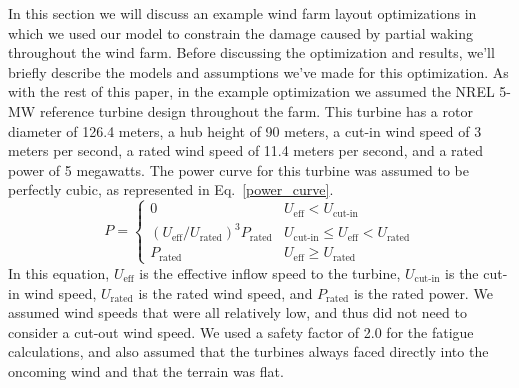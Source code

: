 \documentclass[11pt,letterpaper]{article}
\begin{document}
In this section we will discuss an example wind farm layout optimizations in which we used our model to constrain the damage caused by partial waking throughout the wind farm. Before discussing the optimization and results, we'll briefly describe the models and assumptions we've made for this optimization. As with the rest of this paper, in the example optimization we assumed the NREL 5-MW reference turbine design throughout the farm. This turbine has a rotor diameter of 126.4 meters, a hub height of 90 meters, a cut-in wind speed of 3 meters per second, a rated wind speed of 11.4 meters per second, and a rated power of 5 megawatts. The power curve for this turbine was assumed to be perfectly cubic, as represented in Eq.~\ref{power_curve}. 
% 
\begin{equation}
    P = \begin{cases} 
      0 &  U_\text{eff} < U_\text{cut-in} \\
      (U_\text{eff}/U_\text{rated})^3 P_\text{rated} &  U_\text{cut-in} \leq U_\text{eff} < U_\text{rated}\\
      P_\text{rated} & U_\text{eff} \geq U_\text{rated}
   \end{cases}
   \label{power_curve}
\end{equation}
% 
In this equation, $U_\text{eff}$ is the effective inflow speed to the turbine, $U_\text{cut-in}$ is the cut-in wind speed, $U_\text{rated}$ is the rated wind speed, and $P_\text{rated}$ is the rated power.
We assumed wind speeds that were all relatively low, and thus did not need to consider a cut-out wind speed.
We used a safety factor of 2.0 for the fatigue calculations, and also
assumed that the turbines always faced directly into the oncoming wind and that the terrain was flat.

\end{document}
